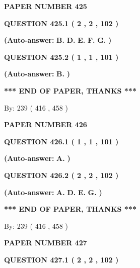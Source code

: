 \documentclass[12pt]{article}
\begin{document}
   
   
   
\newpage 
\setcounter{page}{ 
   425001 } 
   
   
 {\textbf{ \Large{ PAPER NUMBER  425  }}}
   
   
  
  
{\textbf{\large{QUESTION
425.1 
 ( 2 , 2 , 102 )
}}}
 
 
{\textbf{(Auto-answer:}}
{\textbf{\large{
B.}}}
{\textbf{\large{
D.}}}
{\textbf{\large{
E.}}}
{\textbf{\large{
F.}}}
{\textbf{\large{
G.}}}
{\textbf{)}}
 
 
  
  
{\textbf{\large{QUESTION
425.2 
 ( 1 , 1 , 101 )
}}}
 
 
{\textbf{(Auto-answer:}}
{\textbf{\large{
B.}}}
{\textbf{)}}
 
 
   
   
\vspace{1.0in} 
{\textbf{\large{ *** END OF PAPER, THANKS *** }}} 
   
   
\hspace{1.0in} By: 
 239 ( 416 ,  458 )
   
   
   
   
\newpage 
\setcounter{page}{ 
   426001 } 
   
   
 {\textbf{ \Large{ PAPER NUMBER  426  }}}
   
   
  
  
{\textbf{\large{QUESTION
426.1 
 ( 1 , 1 , 101 )
}}}
 
 
{\textbf{(Auto-answer:}}
{\textbf{\large{
A.}}}
{\textbf{)}}
 
 
  
  
{\textbf{\large{QUESTION
426.2 
 ( 2 , 2 , 102 )
}}}
 
 
{\textbf{(Auto-answer:}}
{\textbf{\large{
A.}}}
{\textbf{\large{
D.}}}
{\textbf{\large{
E.}}}
{\textbf{\large{
G.}}}
{\textbf{)}}
 
 
   
   
\vspace{1.0in} 
{\textbf{\large{ *** END OF PAPER, THANKS *** }}} 
   
   
\hspace{1.0in} By: 
 239 ( 416 ,  458 )
   
   
   
   
\newpage 
\setcounter{page}{ 
   427001 } 
   
   
 {\textbf{ \Large{ PAPER NUMBER  427  }}}
   
   
  
  
{\textbf{\large{QUESTION
427.1 
 ( 2 , 2 , 102 )
}}}
 
\end{document}
